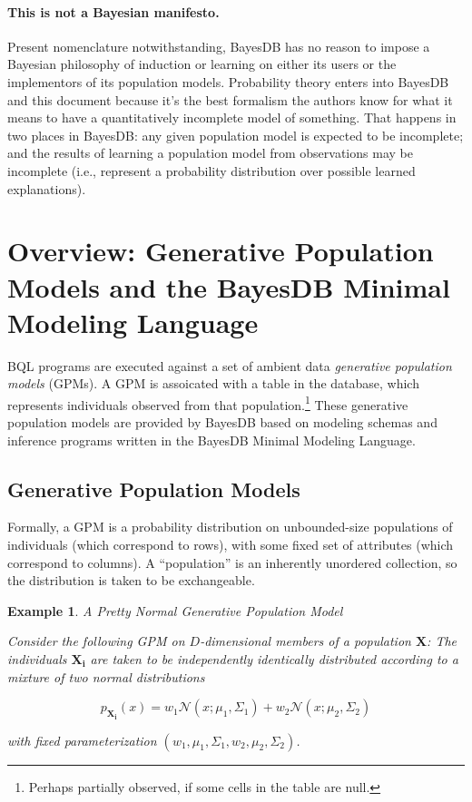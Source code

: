 \documentclass[10pt,letterpaper]{article}
\newtheorem{example}{Example}[section]
\begin{document}
\paragraph{This is not a Bayesian manifesto.}  Present nomenclature
notwithstanding, BayesDB has no reason to impose a Bayesian philosophy
of induction or learning on either its users or the implementors of
its population models.  Probability theory enters into BayesDB and
this document because it's the best formalism the authors know for
what it means to have a quantitatively incomplete model of something.
That happens in two places in BayesDB: any given population model is
expected to be incomplete; and the results of learning a population
model from observations may be incomplete (i.e., represent a
probability distribution over possible learned explanations).


\section{Overview: Generative Population Models and the BayesDB Minimal Modeling Language}
\label{sec:overview}

BQL programs are executed against a set of ambient data
\textit{generative population models} (GPMs).  A GPM is assoicated
with a table in the database, which represents individuals observed
from that population.\footnote{Perhaps partially observed, if some cells in the
  table are null.} These generative population models are provided by
BayesDB based on modeling schemas and inference programs written in
the BayesDB Minimal Modeling Language.

\subsection{Generative Population Models}

Formally, a GPM is a probability distribution on unbounded-size
populations of individuals (which correspond to rows), with some fixed
set of attributes (which correspond to columns). A ``population'' is
an inherently unordered collection, so the distribution is taken to be
exchangeable.

\begin{example} \label{ex:normal_gpm} A Pretty Normal Generative Population
Model

Consider the following GPM on $D$-dimensional members of
a population $\mathbf{X}$: The individuals $\mathbf{X_i}$ are taken to
be independently identically distributed according to a mixture of two
normal distributions

\[ p_\mathbf{X_i}(x) = w_1\mathcal{N}(x;\mu_1,\Sigma_1) +
 w_2\mathcal{N}(x;\mu_2,\Sigma_2) \]

with fixed parameterization $(w_1, \mu_1, \Sigma_1, w_2, \mu_2, \Sigma_2)$.
\end{example}
\end{document}

